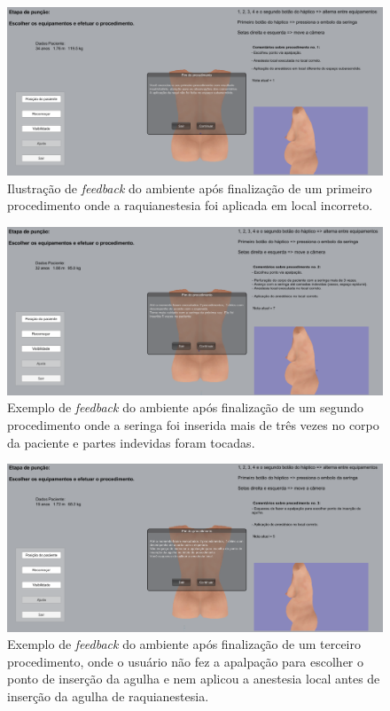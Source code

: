 \begin{figure}[ht!]
    \centering
    \includegraphics[width=\textwidth]{capitulos/figuras/sistema-exemplo-execucao-procedimento-1.png} 
    \caption{Ilustração de \textit{feedback} do ambiente após finalização de um primeiro procedimento onde a raquianestesia foi aplicada em local incorreto.}
    \label{fig:sistemaExecucao1RaquiLocalIncorreto}
\end{figure}

\begin{figure}[ht!]
    \centering
    \includegraphics[width=\textwidth]{capitulos/figuras/sistema-exemplo-execucao-procedimento-2.png} 
    \caption{Exemplo de \textit{feedback} do ambiente após finalização de um segundo procedimento onde a seringa foi inserida mais de três vezes no corpo da paciente e partes indevidas foram tocadas.}
    \label{fig:sistemaExecucao2seringaCorreto}
\end{figure}

\begin{figure}[ht!]
    \centering
    \includegraphics[width=\textwidth]{capitulos/figuras/sistema-exemplo-execucao-procedimento-3.png} 
    \caption{Exemplo de \textit{feedback} do ambiente após finalização de um terceiro procedimento, onde o usuário não fez a apalpação para escolher o ponto de inserção da agulha e nem aplicou a anestesia local antes de inserção da agulha de raquianestesia.}
    \label{fig:sistemaExecucao3faltouApalpacaoAnestesiaLocalIncorreto}
\end{figure}

